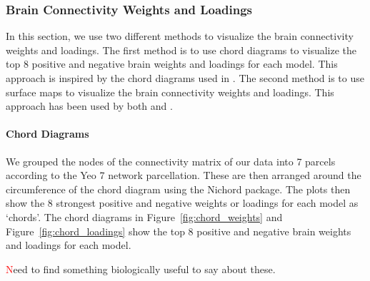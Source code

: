 \subsubsection{Brain Connectivity Weights and Loadings}

In this section, we use two different methods to visualize the brain connectivity weights and loadings.
The first method is to use chord diagrams to visualize the top 8 positive and negative brain weights and loadings for each model.
This approach is inspired by the chord diagrams used in \cite{smith2015positive}.
The second method is to use surface maps to visualize the brain connectivity weights and loadings.
This approach has been used by both \cite{ferreira2022hierarchical} and \cite{smith2015positive}.

\paragraph{Chord Diagrams}
We grouped the nodes of the connectivity matrix of our data into 7 parcels according to the Yeo 7 network parcellation\cite{yeo2011organization}.
These are then arranged around the circumference of the chord diagram using the Nichord package\cite{bogdan2023connsearch}.
The plots then show the 8 strongest positive and negative weights or loadings for each model as `chords'.
The chord diagrams in Figure~\ref{fig:chord_weights} and Figure~\ref{fig:chord_loadings} show the top 8 positive and negative brain weights and loadings for each model.

\textcolor{red} Need to find something biologically useful to say about these.

